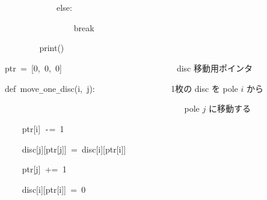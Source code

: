 \documentclass[a4paper,10pt]{article}
\def\mc{\relax}
\begin{document}
\noindent
\mbox{}{\tt\mc \ }{\tt\mc \ }{\tt\mc \ }{\tt\mc \ }{\tt\mc \ }{\tt\mc \ }{\tt\mc \ }{\tt\mc \ }{\tt\mc \ }{\tt\mc \ }{\tt\mc \ }{\tt\mc \ }else:

\noindent
\mbox{}{\tt\mc \ }{\tt\mc \ }{\tt\mc \ }{\tt\mc \ }{\tt\mc \ }{\tt\mc \ }{\tt\mc \ }{\tt\mc \ }{\tt\mc \ }{\tt\mc \ }{\tt\mc \ }{\tt\mc \ }{\tt\mc \ }{\tt\mc \ }{\tt\mc \ }{\tt\mc \ }break

\noindent
\mbox{}{\tt\mc \ }{\tt\mc \ }{\tt\mc \ }{\tt\mc \ }{\tt\mc \ }{\tt\mc \ }{\tt\mc \ }{\tt\mc \ }print()

\noindent
\mbox{}\hfill

\noindent
\mbox{}ptr{\tt\mc \ }={\tt\mc \ }[0,{\tt\mc \ }0,{\tt\mc \ }0]{\tt\mc \ }{\tt\mc \ }{\tt\mc \ }{\tt\mc \ }{\tt\mc \ }{\tt\mc \ }{\tt\mc \ }{\tt\mc \ }{\tt\mc \ }{\tt\mc \ }{\tt\mc \ }{\tt\mc \ }{\tt\mc \ }{\tt\mc \ }{\tt\mc \ }{\tt\mc \ }{\tt\mc \ }{\tt\mc \ }{\tt\mc \ }{\tt\mc \ }{\tt\mc \ }{\tt\mc \ }{\tt\mc \ }{\tt\mc \ }{\tt\mc \ }\rm\mc {\tt\#} \ disc 移動用ポインタ \hfill 
\tt\mc 

\noindent
\mbox{}\hfill

\noindent
\mbox{}def{\tt\mc \ }move{\tt\_}one{\tt\_}disc(i,{\tt\mc \ }j):{\tt\mc \ }{\tt\mc \ }{\tt\mc \ }{\tt\mc \ }{\tt\mc \ }{\tt\mc \ }{\tt\mc \ }{\tt\mc \ }{\tt\mc \ }{\tt\mc \ }{\tt\mc \ }{\tt\mc \ }{\tt\mc \ }{\tt\mc \ }{\tt\mc \ }{\tt\mc \ }\rm\mc {\tt\#} \ 1枚の disc を pole $i$ から \hfill 
\tt\mc 

\noindent
\mbox{}{\tt\mc \ }{\tt\mc \ }{\tt\mc \ }{\tt\mc \ }{\tt\mc \ }{\tt\mc \ }{\tt\mc \ }{\tt\mc \ }{\tt\mc \ }{\tt\mc \ }{\tt\mc \ }{\tt\mc \ }{\tt\mc \ }{\tt\mc \ }{\tt\mc \ }{\tt\mc \ }{\tt\mc \ }{\tt\mc \ }{\tt\mc \ }{\tt\mc \ }{\tt\mc \ }{\tt\mc \ }{\tt\mc \ }{\tt\mc \ }{\tt\mc \ }{\tt\mc \ }{\tt\mc \ }{\tt\mc \ }{\tt\mc \ }{\tt\mc \ }{\tt\mc \ }{\tt\mc \ }{\tt\mc \ }{\tt\mc \ }{\tt\mc \ }{\tt\mc \ }{\tt\mc \ }{\tt\mc \ }{\tt\mc \ }{\tt\mc \ }\rm\mc {\tt\#} \ pole $j$ に移動する \hfill 
\tt\mc 

\noindent
\mbox{}{\tt\mc \ }{\tt\mc \ }{\tt\mc \ }{\tt\mc \ }ptr[i]{\tt\mc \ }{\tt -}={\tt\mc \ }1

\noindent
\mbox{}{\tt\mc \ }{\tt\mc \ }{\tt\mc \ }{\tt\mc \ }disc[j][ptr[j]]{\tt\mc \ }={\tt\mc \ }disc[i][ptr[i]]

\noindent
\mbox{}{\tt\mc \ }{\tt\mc \ }{\tt\mc \ }{\tt\mc \ }ptr[j]{\tt\mc \ }+={\tt\mc \ }1

\noindent
\mbox{}{\tt\mc \ }{\tt\mc \ }{\tt\mc \ }{\tt\mc \ }disc[i][ptr[i]]{\tt\mc \ }={\tt\mc \ }0
\end{document}
